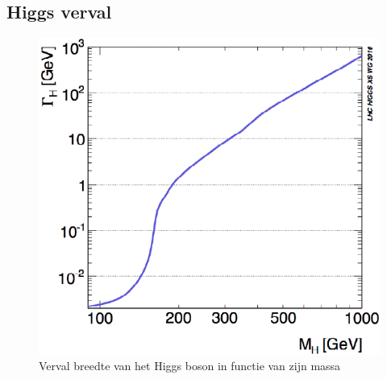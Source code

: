 \documentclass[../main.tex]{subfiles}
\begin{document}
\subsection{Higgs verval}%
\label{sub:higgs_verval}

\begin{figure}[h]
    \centering
    \includegraphics[width=0.5\linewidth]{higgs_boson/verval_breedte_higgs.png}
    \caption{Verval breedte van het Higgs boson in functie van zijn massa}%
    \label{fig:higgs_boson/verval_breedte_higgs}
\end{figure}
\end{document}
